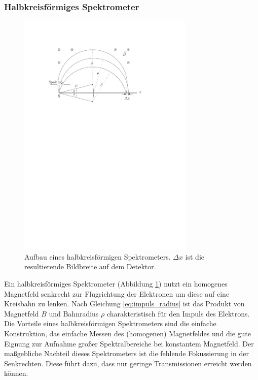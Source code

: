 \documentclass[11pt, a4paper]{article}
\numberwithin{equation}{section}
\begin{document}
\subsubsection{Halbkreisförmiges Spektrometer}
\begin{figure}[h]
	\centering
	\includegraphics[width=0.75\textwidth]{./figures/semicircular_spectrometer.pdf}
	\caption{Aufbau eines halbkreisförmigen Spektrometers. $\Delta x$ ist die resultierende Bildbreite auf dem Detektor.}
	\label{fig:semicirc_spectro}
\end{figure}
Ein halbkreisförmiges Spektrometer (Abbildung \ref{fig:semicirc_spectro}) nutzt ein homogenes Magnetfeld senkrecht zur Flugrichtung der Elektronen um diese auf eine Kreisbahn zu lenken.
Nach Gleichung \eqref{eq:impuls_radius} ist das Produkt von Magnetfeld $B$ und Bahnradius $\rho$ charakteristisch für den Impuls des Elektrons.
Die Vorteile eines halbkreisförmigen Spektrometers sind die einfache Konstruktion, das einfache Messen des (homogenen) Magnetfeldes und die gute Eignung zur Aufnahme großer Spektralbereiche bei konstantem Magnetfeld.
Der maßgebliche Nachteil dieses Spektrometers ist die fehlende Fokussierung in der Senkrechten.
Diese führt dazu, dass nur geringe Transmissionen erreicht werden können.
\end{document}
